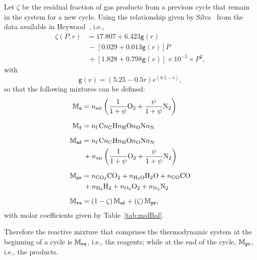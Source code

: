     Let $\zeta$ be the residual fraction of gas products from a previous cycle that remain in the system for a new cycle. Using the relationship given by Silva~\cite{2018-SilvaRKO-UTFPR}  from
    the data available in Heywood~\cite{1988-HeywoodJB-McGrawHill}, i.e.,%
    \begin{align}
        \zeta(P, r) &= 17.807 + 6.423\mathtt{g}(r) \nonumber\\
                    &\,- [0.029 + 0.013\mathtt{g}(r)] P \nonumber\\
                    &\,+ [1.828 + 0.798\mathtt{g}(v)] \times 10^{-5} \times P^2,
        \label{eq:zeta}
    \end{align}
    \noindent with%
    \begin{equation}
        \mathtt{g}(v) = (5.25 - 0.5r) e^{(8.5 - r)},
        \label{eq:zeta.g}
    \end{equation}
    \noindent so that the following mixtures can be defined:%
    \begin{align}
        \label{eq:MXAIR}
        \MXAIR  &=  \NA\left(
                        \frac{1}{1+\psi}\mbox{\ce{O2}} +
                        \frac{\psi}{1+\psi}\mbox{\ce{N2}}
                    \right)
                \\[\medskipamount]
        \label{eq:MXFUE}
        \MXFUE  &=  \NF\,\mbox{\ce{C\NC H\NH O\NO N\NN}}
                \\[\medskipamount]
        \label{eq:MXAFU}
        \MXAFU  &=  \NF\,\mbox{\ce{C\NC H\NH O\NO N\NN}} \nonumber\\
                &\,+\NA\left(
                        \frac{1}{1+\psi}\mbox{\ce{O2}} +
                        \frac{\psi}{1+\psi}\mbox{\ce{N2}}
                    \right)
                \\[\medskipamount]
        \label{eq:MXPRO}
        \MXPRO  &=  \NCOO\mbox{\ce{CO2}} +
                    \NHHO\mbox{\ce{H2O}} +
                    \NCO\mbox{\ce{CO}} \nonumber\\
                &\,+\NHH\mbox{\ce{H2}} +
                    \NOO\mbox{\ce{O2}} +
                    \NNN\mbox{\ce{N2}}
                \\[\medskipamount]
        \label{eq:MXREA}
        \MXREA  &=  (1 - \zeta)\,\MXAFU + (\zeta)\,\MXPRO,
    \end{align}
    \noindent with molar coefficients given by Table~\ref{tab:molBal}.

    Therefore the reactive mixture that comprises the thermodynamic system at the beginning of a cycle is $\mathbb{M}_{\mbox{\scriptsize\tt re}}$, i.e., the reagents; while at the end  of  the  cycle,  $\mathbb{M}_{\mbox{\scriptsize\tt pr}}$,  i.e.,  the
    products.


